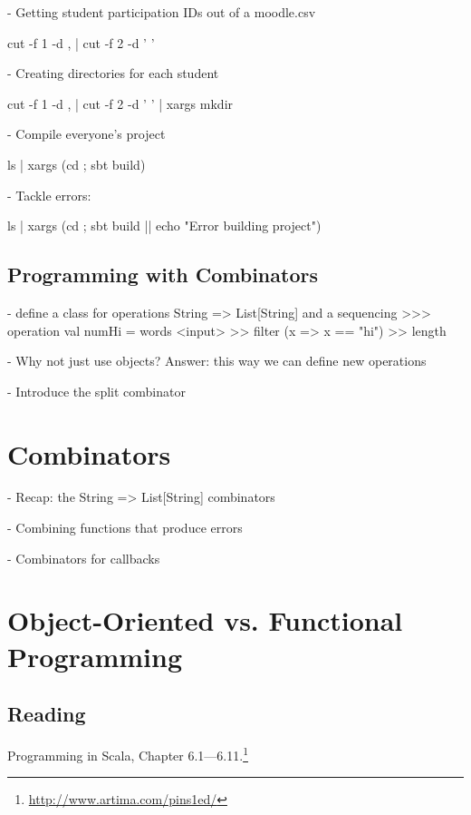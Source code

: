 \documentclass[9pt]{extbook}
\begin{document}
  - Getting student participation IDs out of a moodle.csv

    cut -f 1 -d , | cut -f 2 -d ' '

  - Creating directories for each student

    cut -f 1 -d , | cut -f 2 -d ' ' | xargs mkdir

  - Compile everyone's project

    ls | xargs (cd {}; sbt build)

  - Tackle errors:

    ls | xargs (cd {}; sbt build || echo "Error building project")

\section{Programming with Combinators}

- define a class for operations String => List[String] and a
  sequencing >>> operation
  val numHi = words <input> >> filter (x => x == "hi") >> length

- Why not just use objects? Answer: this way we can define new operations

- Introduce the split combinator

\chapter{Combinators}

- Recap: the String => List[String] combinators

- Combining functions that produce errors

- Combinators for callbacks







\chapter{Object-Oriented vs. Functional Programming}

\section{Reading}

Programming in Scala, Chapter 6.1---6.11.\footnote{\url{http://www.artima.com/pins1ed/}}
\end{document}

